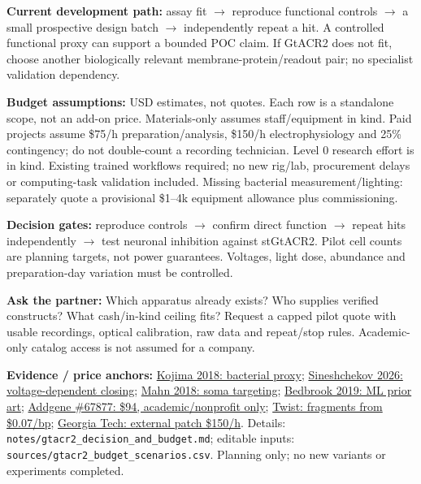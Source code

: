 \documentclass[10pt]{article}
\begin{document}
\textbf{Current development path:} assay fit $\rightarrow$ reproduce functional controls $\rightarrow$ a small prospective design batch $\rightarrow$ independently repeat a hit. A controlled functional proxy can support a bounded POC claim. If GtACR2 does not fit, choose another biologically relevant membrane-protein/readout pair; no specialist validation dependency.

\textbf{Budget assumptions:} USD estimates, not quotes. Each row is a standalone scope, not an add-on price. Materials-only assumes staff/equipment in kind. Paid projects assume \$75/h preparation/analysis, \$150/h electrophysiology and 25\% contingency; do not double-count a recording technician. Level 0 research effort is in kind. Existing trained workflows required; no new rig/lab, procurement delays or computing-task validation included. Missing bacterial measurement/lighting: separately quote a provisional \$1--4k equipment allowance plus commissioning.

\textbf{Decision gates:} reproduce controls $\rightarrow$ confirm direct function $\rightarrow$ repeat hits independently $\rightarrow$ test neuronal inhibition against stGtACR2. Pilot cell counts are planning targets, not power guarantees. Voltages, light dose, abundance and preparation-day variation must be controlled.

\textbf{Ask the partner:} Which apparatus already exists? Who supplies verified constructs? What cash/in-kind ceiling fits? Request a capped pilot quote with usable recordings, optical calibration, raw data and repeat/stop rules. Academic-only catalog access is not assumed for a company.

\scriptsize
\textbf{Evidence / price anchors:}
\href{https://pmc.ncbi.nlm.nih.gov/articles/PMC6194965/}{Kojima 2018: bacterial proxy};
\href{https://pubmed.ncbi.nlm.nih.gov/42139291/}{Sineshchekov 2026: voltage-dependent closing};
\href{https://pubmed.ncbi.nlm.nih.gov/30297821/}{Mahn 2018: soma targeting};
\href{https://www.nature.com/articles/s41592-019-0583-8}{Bedbrook 2019: ML prior art};
\href{https://www.addgene.org/67877/}{Addgene \#67877: \$94, academic/nonprofit only};
\href{https://www.twistbioscience.com/products/genes?tab=overview}{Twist: fragments from \$0.07/bp};
\href{https://research.gatech.edu/bio/research/core-facilities/neuroscience-core/service-fees}{Georgia Tech: external patch \$150/h}.
Details: \texttt{notes/gtacr2\_decision\_and\_budget.md}; editable inputs: \texttt{sources/gtacr2\_budget\_scenarios.csv}. Planning only; no new variants or experiments completed.
\end{document}
